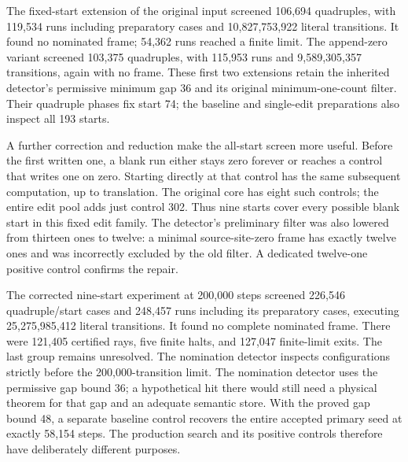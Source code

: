 The fixed-start extension of the original input screened 106,694 quadruples,
with 119,534 runs including preparatory cases and 10,827,753,922 literal
transitions. It found no nominated frame; 54,362 runs reached a finite
limit. The append-zero variant screened 103,375 quadruples, with 115,953
runs and 9,589,305,357 transitions, again with no frame. These first two
extensions retain the inherited detector's permissive minimum gap 36 and
its original minimum-one-count filter. Their quadruple phases fix start 74;
the baseline and single-edit preparations also inspect all 193 starts.

A further correction and reduction make the all-start screen more useful.
Before the first written one, a blank run either stays zero forever or
reaches a control that writes one on zero. Starting directly at that control
has the same subsequent computation, up to translation. The original core
has eight such controls; the entire edit pool adds just control 302. Thus
nine starts cover every possible blank start in this fixed edit family.
The detector's preliminary filter was also lowered from thirteen ones to
twelve: a minimal source-site-zero frame has exactly twelve ones and was
incorrectly excluded by the old filter. A dedicated twelve-one positive
control confirms the repair.

The corrected nine-start experiment at 200,000 steps screened 226,546
quadruple/start cases and 248,457 runs including its preparatory cases,
executing 25,275,985,412 literal transitions. It found no complete nominated
frame. There were 121,405 certified rays, five finite halts, and 127,047
finite-limit exits. The last group remains unresolved. The nomination
detector inspects configurations strictly before the 200,000-transition
limit. The nomination
detector uses the permissive gap bound 36; a hypothetical hit there would
still need a physical theorem for that gap and an adequate semantic store.
With the proved gap bound 48, a separate baseline control recovers the
entire accepted primary seed at exactly 58,154 steps. The production search
and its positive controls therefore have deliberately different purposes.

